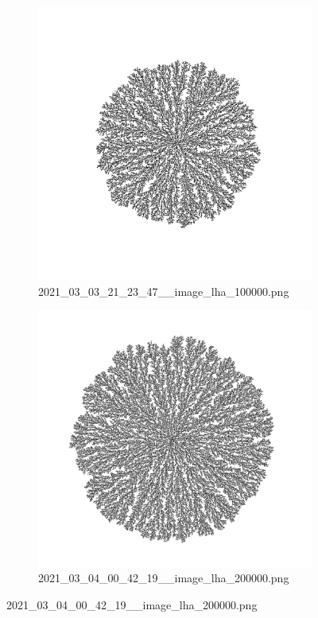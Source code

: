 \documentclass[12pt,a4paper]{scrartcl}
\numberwithin{equation}{subsection}
\newcommand{\1}{\mathbbm{1}}
\numberwithin{equation}{section}
\theoremstyle{definition}
\begin{document}
\begin{figure}[p]
	\centering
	\begin{subfigure}[]{0.72\textwidth}
		\includegraphics[width=1\linewidth]{images/ia/2021_03_03_21_23_47__image_lha_100000.png}
		\caption{2021\_03\_03\_21\_23\_47\_\_image\_lha\_100000.png} 
	\end{subfigure}
	\begin{subfigure}[]{0.72\textwidth}
		\includegraphics[width=1\linewidth]{images/ia/2021_03_04_00_42_19__image_lha_200000.png}
		\caption{2021\_03\_04\_00\_42\_19\_\_image\_lha\_200000.png} 
	\end{subfigure}
\end{figure}
\end{document}
